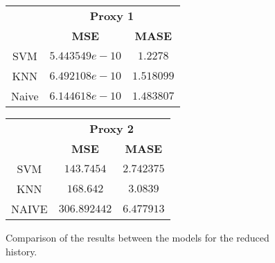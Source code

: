 \begin{figure}[!h]
\centering
\begin{minipage}{\textwidth}
\begin{minipage}{0.5\textwidth}
\begin{center}
\vskip10pt
   \begin{footnotesize}
   \begin{tabular}{|c|c|c|}
   \hline
   & \multicolumn{2}{|c|}{\textbf{Proxy 1}} \\ \cline{2-3}
   & \textbf{MSE} & \textbf{MASE}          \\ \hline
   SVM  & $5.443549e-10$ & $1.2278$         \\ 
   KNN & $6.492108e-10$ & $1.518099$ \\ 
   Naive & $6.144618e-10$ & $1.483807$     \\ 
   \hline
   \end{tabular}
   \end{footnotesize}
\end{center}
\end{minipage}
\begin{minipage}{0.5\textwidth}
\begin{center}
\vskip12pt
   \begin{footnotesize}
   \begin{tabular}{|c|c|c|}
   \hline
   & \multicolumn{2}{|c|}{\textbf{Proxy 2}} \\ \cline{2-3}
   & \textbf{MSE} & \textbf{MASE}          \\ \hline
   SVM  & $143.7454$      & $2.742375$         \\ 
   KNN & $168.642$      & $3.0839$ \\ 
   NAIVE & $306.892442$ & $6.477913$      \\ 
   \hline
   \end{tabular}
   \end{footnotesize}
\end{center}
\end{minipage}
\end{minipage}
\caption{Comparison of the results between the models for the reduced history.}
\label{fig:compare6m}
\end{figure}